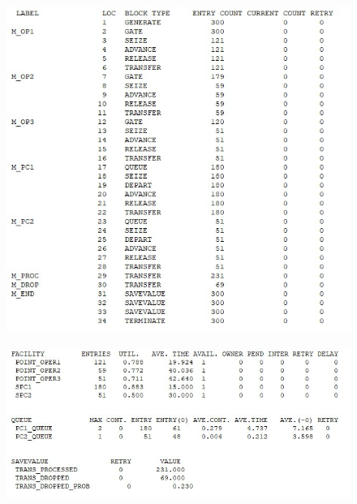 \begin{figure}[ht!]
	\includegraphics[width=0.55\linewidth]{assets/images/res2.jpg}
	\label{fig:r2}
\end{figure}

\begin{figure}[ht!]
	\includegraphics[width=0.75\linewidth]{assets/images/res3.jpg}
	\label{fig:r2}
\end{figure}